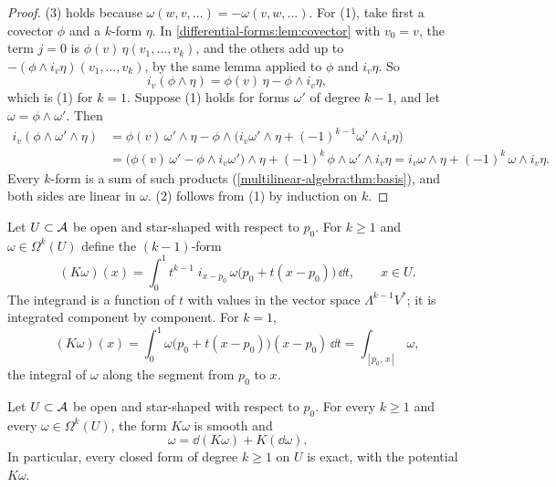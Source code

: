 \begin{notechapter}
\begin{proof}
(3) holds because $\omega(w, v,\dots) = -\omega(v, w,\dots)$. For (1),
take first a covector $\phi$ and a $k$-form $\eta$. In
\cref{differential-forms:lem:covector} with $v_0 = v$, the term $j = 0$
is $\phi(v)\,\eta(v_1,\dots,v_k)$, and the others add up to
$-(\phi\wedge i_v\eta)(v_1,\dots,v_k)$, by the same lemma applied to
$\phi$ and $i_v\eta$. So
\[
  i_v(\phi\wedge\eta) = \phi(v)\,\eta - \phi\wedge i_v\eta ,
\]
which is (1) for $k = 1$. Suppose (1) holds for forms $\omega'$ of
degree $k - 1$, and let $\omega = \phi\wedge\omega'$. Then
\begin{align*}
  i_v(\phi\wedge\omega'\wedge\eta)
  &= \phi(v)\,\omega'\wedge\eta
     - \phi\wedge\bigl(i_v\omega'\wedge\eta
     + (-1)^{k-1}\omega'\wedge i_v\eta\bigr) \\
  &= \bigl(\phi(v)\,\omega' - \phi\wedge i_v\omega'\bigr)\wedge\eta
     + (-1)^k\,\phi\wedge\omega'\wedge i_v\eta
   = i_v\omega\wedge\eta + (-1)^k\,\omega\wedge i_v\eta .
\end{align*}
Every $k$-form is a sum of such products
(\cref{multilinear-algebra:thm:basis}), and both sides are linear in
$\omega$. (2) follows from (1) by induction on $k$.
\end{proof}

Let $U\subset\mathcal{A}$ be open and star-shaped with respect to $p_0$. For
$k\geq1$ and $\omega\in\Omega^k(U)$ define the $(k - 1)$-form
\begin{equation}\label{differential-forms:eq:homotopy}
  (K\omega)(x)
  = \int_0^1t^{k-1}\;i_{x - p_0}\,
    \omega\bigl(p_0 + t(x - p_0)\bigr)\,\dd t ,
  \qquad x\in U .
\end{equation}
The integrand is a function of $t$ with values in the vector space
$\Lambda^{k-1}V^*$; it is integrated component by component. For
$k = 1$,
\[
  (K\omega)(x) = \int_0^1\omega\bigl(p_0 + t(x - p_0)\bigr)(x - p_0)\,
  \dd t = \int_{[p_0,\,x]}\omega ,
\]
the integral of $\omega$ along the segment from $p_0$ to $x$.

\begin{theorem}\label{differential-forms:thm:poincare}
Let $U\subset\mathcal{A}$ be open and star-shaped with respect to $p_0$. For
every $k\geq1$ and every $\omega\in\Omega^k(U)$, the form $K\omega$ is
smooth and
\[
  \omega = \dd(K\omega) + K(\dd\omega) .
\]
In particular, every closed form of degree $k\geq1$ on $U$ is exact,
with the potential $K\omega$.
\end{theorem}


\end{notechapter}
